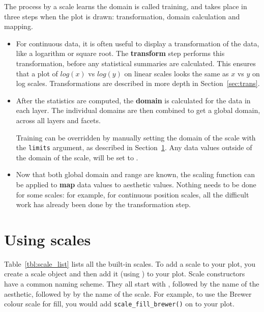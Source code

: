 The process by a scale learns the domain is called training, and takes place in three steps when the plot is drawn: transformation, domain calculation and mapping.  

\begin{itemize}
	\item  For continuous data, it is often useful to display a transformation of the data, like a logarithm or square root.  The {\bf transform} step performs this transformation, before any statistical summaries are calculated.  This ensures that a plot of $log(x)$ vs $log(y)$ on linear scales looks the same as $x$ vs $y$ on log scales.  Transformations are described in more depth in Section~\ref{sec:trans}. 

	\item After the statistics are computed, the {\bf domain} is calculated for the data in each layer.  The individual domains are then combined to get a global domain, across all layers and facets.  
	
	Training can be overridden by manually setting the domain of the scale with the {\tt limits} argument, as described in Section~\ref{sec:scale-usage}.  Any data values outside of the domain of the scale, will be set to .

	\item Now that both global domain and range are known, the scaling function can be applied to {\bf map} data values to aesthetic values.  Nothing needs to be done for some scales: for example, for continuous position scales, all the difficult work has already been done by the transformation step.
	
\end{itemize}

\section{Using scales}
\label{sec:scale-usage}

Table~\ref{tbl:scale_list} lists all the built-in scales.  To add a scale to your plot, you create a scale object and then add it (using \code{+}) to your plot. Scale constructors have a common naming scheme.  They all start with , followed by the name of the aesthetic, followed by by the name of the scale. For example, to use the Brewer colour scale for fill, you would add {\tt scale\_fill\_brewer()} on to your plot.  

%

